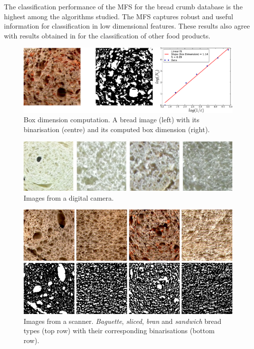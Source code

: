 The classification performance of the MFS for the bread crumb database is the highest a\-mong the algorithms studied. The MFS captures robust and useful information for classification in low dimensional features. These results also agree with results obtained in \cite{Bosch2011} for the classification of other food products.

\begin{figure}[h!]
\centering
\includegraphics{dimensionbox}
\caption{Box dimension computation. A bread image (left) with its binarisation (centre) and its computed box dimension (right).}
\label{fig:fitbox}
\end{figure}

\begin{figure}[h!]
\centering
\includegraphics{pancamara}
\caption{Images from a digital camera.}
\label{fig:camera}
\end{figure}

\begin{figure}[h!]
\centering
\includegraphics{binarizaciones}
\caption{Images from a scanner. {\em Baguette}, {\em sliced}, {\em bran} and {\em sandwich} bread types (top row) with their corresponding binarisations (bottom row).}
\label{fig:bread}
\end{figure}

